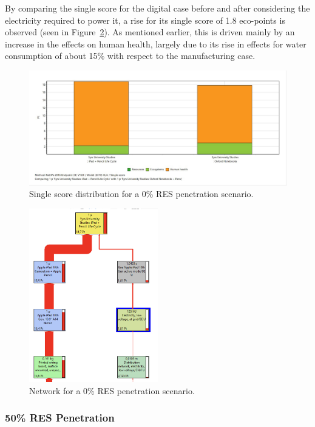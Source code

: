 By comparing the single score for the digital case before and after considering the electricity required to power it, a rise for its single score of 1.8 eco-points is observed (seen in Figure~\ref{fig:0RES_network}). As mentioned earlier, this is driven mainly by an increase in the effects on human health, largely due to its rise in effects for water consumption of about 15\% with respect to the manufacturing case. 

\begin{figure}[H]
    \centering
    \includegraphics[width=\textwidth]{images/RES_0/Single_Score_RES_0.JPG}
    \caption{Single score distribution for a 0\% RES penetration scenario.}\label{fig:single_score_RES0}
\end{figure}

\begin{figure}[H]
    \centering
    \includegraphics[width=0.5\textwidth]{images/RES_0/0RES_network.png}
    \caption{Network for a 0\% RES penetration scenario.}\label{fig:0RES_network}
\end{figure}

\subsubsection{50\% RES Penetration}

